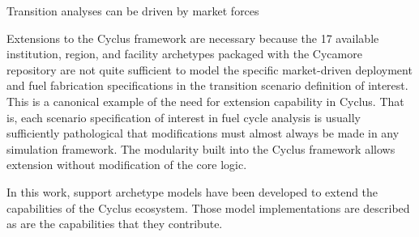 

Transition analyses can be driven by market forces 

Extensions to the Cyclus framework are necessary because the 17 available
institution, region, and facility archetypes packaged with the Cycamore
repository are not quite sufficient to model the specific market-driven
deployment and fuel fabrication specifications in the transition scenario
definition of interest. This is a canonical example of the need for extension
capability in Cyclus. That is, each scenario specification of interest in fuel
cycle analysis is usually sufficiently pathological that modifications must
almost always be made in any simulation framework. The modularity built into
the Cyclus framework allows extension without modification of the core logic.  

In this work, support archetype models have been developed to extend the
capabilities of the Cyclus ecosystem. Those model implementations are described
as are the capabilities that they contribute. 

